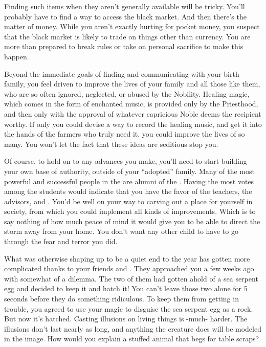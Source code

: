 \documentclass[char]{GL2020}
\begin{document}
Finding such items when they aren't generally available will be tricky. You'll probably have to find a way to access the black market. And then there's the matter of money. While you aren't exactly hurting for pocket money, you suspect that the black market is likely to trade on things other than \pFarm{} currency. You are more than prepared to break rules or take on personal sacrifice to make this happen.

Beyond the immediate goals of finding and communicating with your birth family, you feel driven to improve the lives of your family and all those like them, who are so often ignored, neglected, or abused by the Nobility.  Healing magic, which comes in the form of enchanted music, is provided only by the Priesthood, and then only with the approval of whatever capricious Noble deems the recipient worthy.  If only you could devise a way to record the healing music, and get it into the hands of the farmers who truly need it, you could improve the lives of so many.  You won't let the fact that these ideas are seditious stop you.

Of course, to hold on to any advances you make, you'll need to start building your own base of authority, outside of your ``adopted'' family. Many of the most powerful and successful people in the \pFarm{} are alumni of the \pSchool{}. Having the most votes among the \pFarmers{} students would indicate that you have the favor of the teachers, the advisors, and \cFarmGod{}. You'd be well on your way to carving out a place for yourself in \pFarm{} society, from which you could implement all kinds of improvements. Which is to say nothing of how much peace of mind it would give you to be able to direct the storm away from your home. You don't want any other child to have to go through the fear and terror you did.

What was otherwise shaping up to be a quiet end to the year has gotten more complicated thanks to your friends \cDisney{} and \cPirateChild{}. They approached you a few weeks ago with somewhat of a dilemma. The two of them had gotten ahold of a sea serpent egg and decided to keep it and hatch it! You can't leave those two alone for 5 seconds before they do something ridiculous. To keep them from getting in trouble, you agreed to use your magic to disguise the sea serpent egg as a rock. But now it's hatched. Casting illusions on living things is -much- harder. The illusions don't last nearly as long, and anything the creature does will be modeled in the image. How would you explain a stuffed animal that begs for table scraps?
\end{document}
